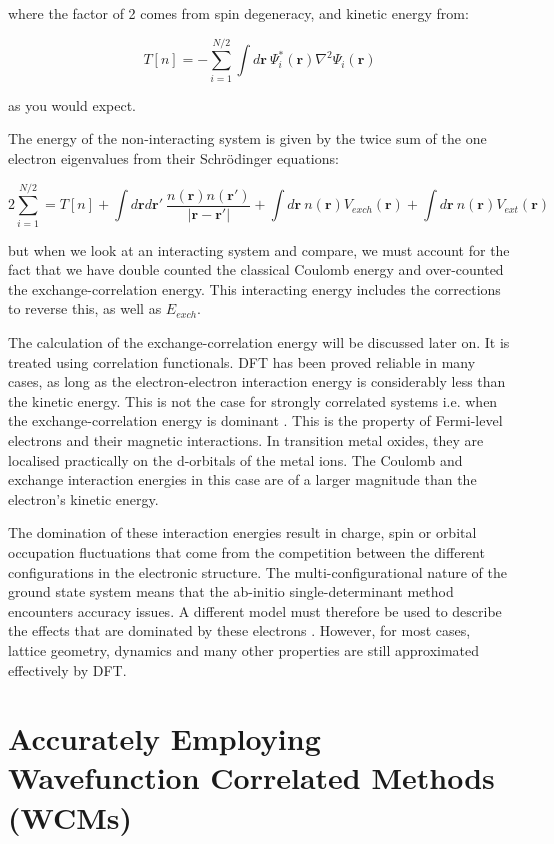 \documentclass[10pt]{article}
\begin{document}
where the factor of 2 comes from spin degeneracy, and kinetic energy from:

$$T[n] = -\sum_{i=1}^{N/2}\int d\mathbf{r} \ \Psi_i^*(\mathbf{r})\nabla^2\Psi_i(\mathbf{r})$$

as you would expect.

The energy of the non-interacting system is given by the twice sum of the one electron eigenvalues from their Schrödinger equations:

$$2\sum_{i=1}^{N/2} = T[n]+\int d\mathbf{r}d\mathbf{r}' \ \frac{n(\mathbf{r})n(\mathbf{r}')}{|\mathbf{r}-\mathbf{r}'|} +\int d\mathbf{r} \ n(\mathbf{r})V_{exch}(\mathbf{r}) + \int d\mathbf{r} \ n(\mathbf{r})V_{ext}(\mathbf{r})$$

but when we look at an interacting system and compare, we must account for the fact that we have double counted the classical Coulomb energy and over-counted the exchange-correlation energy. This interacting energy includes the corrections to reverse this, as well as $E_{exch}$.

The calculation of the exchange-correlation energy will be discussed later on. It is treated using correlation functionals. DFT has been proved reliable in many cases, as long as the electron-electron interaction energy is considerably less than the kinetic energy. This is not the case for strongly correlated systems i.e. when the exchange-correlation energy is dominant \cite{pickett1989electronic}. This is the property of Fermi-level electrons and their magnetic interactions. In transition metal oxides, they are localised practically on the d-orbitals of the metal ions. The Coulomb and exchange interaction energies in this case are of a larger magnitude than the electron's kinetic energy.

The domination of these interaction energies result in charge, spin or orbital occupation fluctuations that come from the competition between the different configurations in the electronic structure. The multi-configurational nature of the ground state system means that the ab-initio single-determinant method encounters accuracy issues. A different model must therefore be used to describe the effects that are dominated by these electrons \cite{gelle2009accurate}. However, for most cases, lattice geometry, dynamics and many other properties are still approximated effectively by DFT.

\section{Accurately Employing Wavefunction Correlated Methods (WCMs)}
\end{document}
